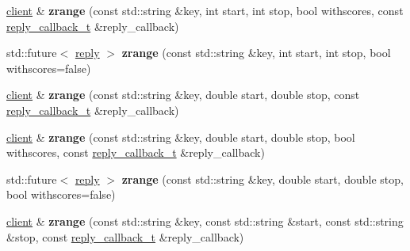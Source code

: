 \begin{DoxyCompactItemize}
\mbox{\hyperlink{classcpp__redis_1_1client}{client}} \& {\bfseries zrange} (const std\+::string \&key, int start, int stop, bool withscores, const \mbox{\hyperlink{classcpp__redis_1_1client_af7a65eb21aa25230bfbb0b0203c4fc04}{reply\+\_\+callback\+\_\+t}} \&reply\+\_\+callback)
\item 
\mbox{\label{classcpp__redis_1_1client_a75f0e330b851c7bfcf373a7ef9f30cb8}} 
std\+::future$<$ \mbox{\hyperlink{classcpp__redis_1_1reply}{reply}} $>$ {\bfseries zrange} (const std\+::string \&key, int start, int stop, bool withscores=false)
\item 
\mbox{\label{classcpp__redis_1_1client_a24f15cede24bdb482167b1ea00db3160}} 
\mbox{\hyperlink{classcpp__redis_1_1client}{client}} \& {\bfseries zrange} (const std\+::string \&key, double start, double stop, const \mbox{\hyperlink{classcpp__redis_1_1client_af7a65eb21aa25230bfbb0b0203c4fc04}{reply\+\_\+callback\+\_\+t}} \&reply\+\_\+callback)
\item 
\mbox{\label{classcpp__redis_1_1client_ab37fd922b733c5fa64f7a0dc4be22efe}} 
\mbox{\hyperlink{classcpp__redis_1_1client}{client}} \& {\bfseries zrange} (const std\+::string \&key, double start, double stop, bool withscores, const \mbox{\hyperlink{classcpp__redis_1_1client_af7a65eb21aa25230bfbb0b0203c4fc04}{reply\+\_\+callback\+\_\+t}} \&reply\+\_\+callback)
\item 
\mbox{\label{classcpp__redis_1_1client_a0286a2953aeaec8c23d0e292fe2fccc2}} 
std\+::future$<$ \mbox{\hyperlink{classcpp__redis_1_1reply}{reply}} $>$ {\bfseries zrange} (const std\+::string \&key, double start, double stop, bool withscores=false)
\item 
\mbox{\label{classcpp__redis_1_1client_ad24c21a0344652d821d0628c68057ecb}} 
\mbox{\hyperlink{classcpp__redis_1_1client}{client}} \& {\bfseries zrange} (const std\+::string \&key, const std\+::string \&start, const std\+::string \&stop, const \mbox{\hyperlink{classcpp__redis_1_1client_af7a65eb21aa25230bfbb0b0203c4fc04}{reply\+\_\+callback\+\_\+t}} \&reply\+\_\+callback)
\item 
\mbox{\label{classcpp__redis_1_1client_a3768026508c4c2e28c600bf7be54b4a1}} 

\end{DoxyCompactItemize}
